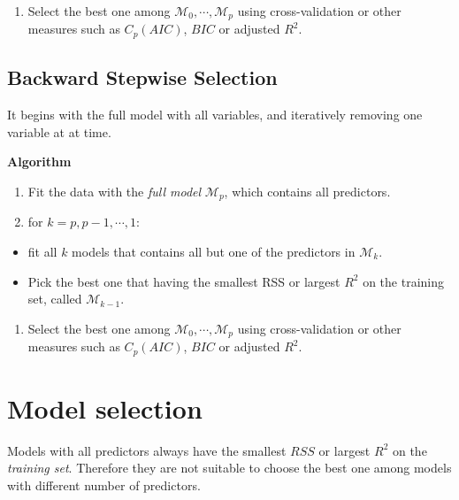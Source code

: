 \documentclass[
  letterpaper,
  DIV=11,
  numbers=noendperiod]{scrreprt}
\providecommand{\tightlist}{%
  \setlength{\itemsep}{0pt}\setlength{\parskip}{0pt}}\usepackage{longtable,booktabs,array}
\begin{document}
\begin{enumerate}
\def\labelenumi{\arabic{enumi}.}
\setcounter{enumi}{2}
\tightlist
\item
  Select the best one among \(\mathcal{M}_0, \cdots, \mathcal{M}_p\)
  using cross-validation or other measures such as \(C_p (AIC)\),
  \(BIC\) or adjusted \(R^2\).
\end{enumerate}

\subsection{Backward Stepwise
Selection}\label{backward-stepwise-selection}

It begins with the full model with all variables, and iteratively
removing one variable at at time.

\textbf{Algorithm}

\begin{enumerate}
\def\labelenumi{\arabic{enumi}.}
\tightlist
\item
  Fit the data with the \emph{full model} \(\mathcal{M}_p\), which
  contains all predictors.
\item
  for \(k=p, p-1, \cdots, 1\):
\end{enumerate}

\begin{itemize}
\tightlist
\item
  fit all \(k\) models that contains all but one of the predictors in
  \(\mathcal{M}_k\).
\item
  Pick the best one that having the smallest RSS or largest \(R^2\) on
  the training set, called \(\mathcal{M}_{k-1}\).
\end{itemize}

\begin{enumerate}
\def\labelenumi{\arabic{enumi}.}
\setcounter{enumi}{2}
\tightlist
\item
  Select the best one among \(\mathcal{M}_0, \cdots, \mathcal{M}_p\)
  using cross-validation or other measures such as \(C_p (AIC)\),
  \(BIC\) or adjusted \(R^2\).
\end{enumerate}

\section{Model selection}\label{model-selection-1}

Models with all predictors always have the smallest \(RSS\) or largest
\(R^2\) on the \emph{training set}. Therefore they are not suitable to
choose the best one among models with different number of predictors.
\end{document}
